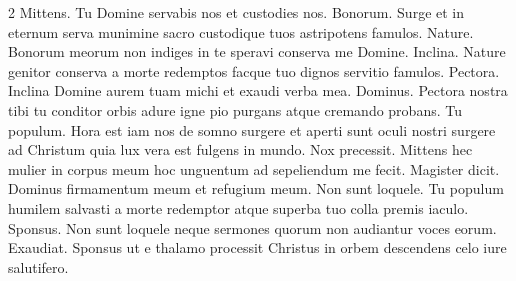 \begin{multicols*}{2}
 Mittens.
 Tu Domine servabis nos et custodies nos.
 Bonorum.
 Surge et in eternum serva munimine sacro custodique tuos astripotens famulos.
 Nature.
 Bonorum meorum non indiges in te speravi conserva me Domine.
 Inclina.
 Nature genitor conserva a morte redemptos facque tuo dignos servitio famulos.
 Pectora.
 Inclina Domine aurem tuam michi et exaudi verba mea.
 Dominus.
 Pectora nostra tibi tu conditor orbis adure igne pio purgans atque cremando probans.
 Tu populum.
 Hora est iam nos de somno surgere et aperti sunt oculi nostri surgere ad Christum quia lux vera est fulgens in mundo.
 Nox precessit.
 Mittens hec mulier in corpus meum hoc unguentum ad sepeliendum me fecit.
 Magister dicit.
 Dominus firmamentum meum et refugium meum.
 Non sunt loquele.
 Tu populum humilem salvasti a morte redemptor atque superba tuo colla premis iaculo.
 Sponsus.
 Non sunt loquele neque sermones quorum non audiantur voces eorum.
 Exaudiat.
 Sponsus ut e thalamo processit Christus in orbem descendens celo iure salutifero.

\end{multicols*}
